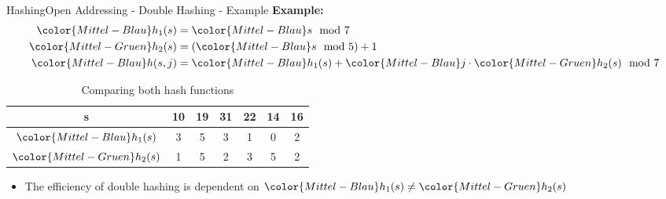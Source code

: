 
\begin{frame}{Hashing}{Open Addressing - Double Hashing - Example}
  \textbf{Example:}
  {\color{Mittel-Blau}
  \begin{align*}
    {\color{Mittel-Blau}h_1(s)} &= {\color{Mittel-Blau}s \mod 7}\\
    {\color{Mittel-Gruen}h_2(s)}
      &= \left({\color{Mittel-Blau}s} \mod 5\right) + 1\\
    {\color{Mittel-Blau}h(s,j)}
      &= {\color{Mittel-Blau}h_1(s)}
      + {\color{Mittel-Blau}j} \cdot {\color{Mittel-Gruen}h_2(s)}
      \mod 7
  \end{align*}}
  \vspace{-1.0em}
  \begin{table}[!h]
    \caption{Comparing both hash functions}
    \begin{tabular}{c|cccccc}
      {\color{Mittel-Blau}s} & 10 & 19 & 31 & 22 & 14 & 16\\
      \midrule
      ${\color{Mittel-Blau}h_1(s)}$ & 3 & 5 & 3 & 1 & 0 & 2\\
      ${\color{Mittel-Gruen}h_2(s)}$ & 1 & 5 & 2 & 3 & 5 & 2
    \end{tabular}
  \end{table}
  \begin{itemize}
    \item
      The efficiency of double hashing is dependent on
      \begin{math}
       {\color{Mittel-Blau}h_1(s)} \neq {\color{Mittel-Gruen}h_2(s)}
      \end{math}
 \end{itemize}
\end{frame}


